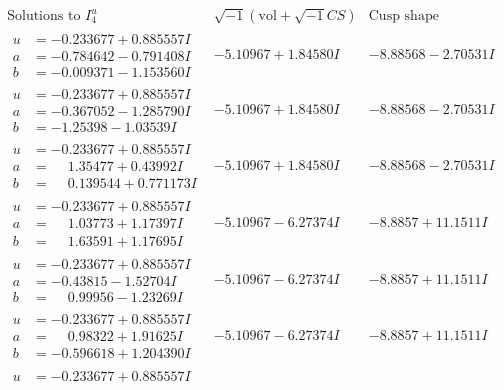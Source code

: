\documentclass[1p]{elsarticle_modified}
\theoremstyle{definition}
\newcommand{\I}{\sqrt{-1}}
\begin{document}
$$\begin{array}{c|c|c}  
\text{Solutions to }I^u_{4}& \I (\text{vol} + \sqrt{-1}CS) & \text{Cusp shape}\\
 \hline 
\begin{aligned}
u &= -0.233677 + 0.885557 I \\
a &= -0.784642 - 0.791408 I \\
b &= -0.009371 - 1.153560 I\end{aligned}
 & -5.10967 + 1.84580 I & -8.88568 - 2.70531 I \\ \hline\begin{aligned}
u &= -0.233677 + 0.885557 I \\
a &= -0.367052 - 1.285790 I \\
b &= -1.25398 - 1.03539 I\end{aligned}
 & -5.10967 + 1.84580 I & -8.88568 - 2.70531 I \\ \hline\begin{aligned}
u &= -0.233677 + 0.885557 I \\
a &= \phantom{-}1.35477 + 0.43992 I \\
b &= \phantom{-}0.139544 + 0.771173 I\end{aligned}
 & -5.10967 + 1.84580 I & -8.88568 - 2.70531 I \\ \hline\begin{aligned}
u &= -0.233677 + 0.885557 I \\
a &= \phantom{-}1.03773 + 1.17397 I \\
b &= \phantom{-}1.63591 + 1.17695 I\end{aligned}
 & -5.10967 - 6.27374 I & -8.8857 + 11.1511 I \\ \hline\begin{aligned}
u &= -0.233677 + 0.885557 I \\
a &= -0.43815 - 1.52704 I \\
b &= \phantom{-}0.99956 - 1.23269 I\end{aligned}
 & -5.10967 - 6.27374 I & -8.8857 + 11.1511 I \\ \hline\begin{aligned}
u &= -0.233677 + 0.885557 I \\
a &= \phantom{-}0.98322 + 1.91625 I \\
b &= -0.596618 + 1.204390 I\end{aligned}
 & -5.10967 - 6.27374 I & -8.8857 + 11.1511 I \\ \hline\begin{aligned}
u &= -0.233677 + 0.885557 I \\

\end{aligned}
\end{array}$$
\end{document}

